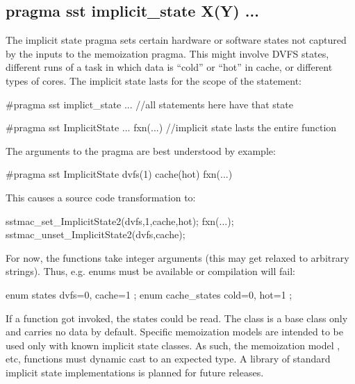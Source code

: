 \subsection{pragma sst implicit\_state X(Y) ...}\label{subsec:implicitStates}
The implicit state pragma sets certain hardware or software states not captured by the inputs to the memoization pragma.
This might involve DVFS states, different runs of a task in which data is ``cold'' or ``hot'' in cache, or different types of cores.
The implicit state lasts for the scope of the statement:

\begin{CppCode}
#pragma sst implict_state ...
{
 //all statements here have that state
}

#pragma sst ImplicitState ...
fxn(...) //implicit state lasts the entire function
\end{CppCode}

The arguments to the pragma are best understood by example:

\begin{CppCode}
#pragma sst ImplicitState dvfs(1) cache(hot)
fxn(...)
\end{CppCode}
This causes a source code transformation to:

\begin{CppCode}
sstmac_set_ImplicitState2(dvfs,1,cache,hot);
fxn(...);
sstmac_unset_ImplicitState2(dvfs,cache);
\end{CppCode}
For now, the functions take integer arguments (this may get relaxed to arbitrary strings).
Thus, e.g. enums must be available or compilation will fail:

\begin{CppCode}
enum states {
 dvfs=0,
 cache=1
};
enum cache_states {
 cold=0,
 hot=1
};
\end{CppCode}

If a  function got invoked, the states could be read.
The class  is a base class only and carries no data by default.
Specific memoization models are intended to be used only with known implicit state classes.
As such, the memoization model , etc, functions must dynamic cast to an expected type.
A library of standard implicit state implementations is planned for future releases.
